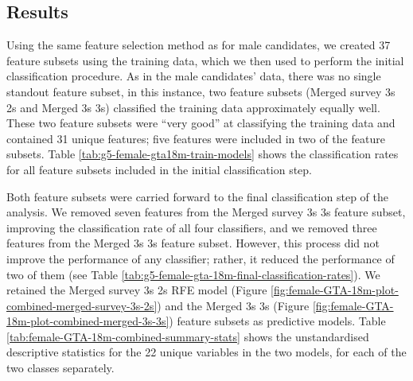 \documentclass[
  12pt,
  a4paper,
]{book}
\begin{document}
\hypertarget{female-gta-results}{%
\subsection{Results}\label{female-gta-results}}

Using the same feature selection method as for male candidates, we created 37 feature subsets using the training data, which we then used to perform the initial classification procedure. As in the male candidates' data, there was no single standout feature subset, in this instance, two feature subsets (Merged survey 3s 2s and Merged 3s 3s) classified the training data approximately equally well. These two feature subsets were ``very good'' at classifying the training data and contained 31 unique features; five features were included in two of the feature subsets. Table \ref{tab:g5-female-gta18m-train-models} shows the classification rates for all feature subsets included in the initial classification step.

Both feature subsets were carried forward to the final classification step of the analysis. We removed seven features from the Merged survey 3s 3s feature subset, improving the classification rate of all four classifiers, and we removed three features from the Merged 3s 3s feature subset. However, this process did not improve the performance of any classifier; rather, it reduced the performance of two of them (see Table \ref{tab:g5-female-gta-18m-final-classification-rates}). We retained the Merged survey 3s 2s RFE model (Figure \ref{fig:female-GTA-18m-plot-combined-merged-survey-3s-2s}) and the Merged 3s 3s (Figure \ref{fig:female-GTA-18m-plot-combined-merged-3s-3s}) feature subsets as predictive models. Table \ref{tab:female-GTA-18m-combined-summary-stats} shows the unstandardised descriptive statistics for the 22 unique variables in the two models, for each of the two classes separately.

\end{document}
